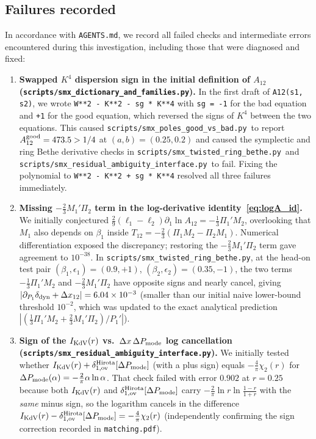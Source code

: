 \documentclass[11pt,a4paper]{article}
\newcommand{\smxdict}{\texttt{scripts/\allowbreak smx\_\allowbreak dictionary\_\allowbreak and\_\allowbreak families.py}}
\newcommand{\smxpoles}{\texttt{scripts/\allowbreak smx\_\allowbreak poles\_\allowbreak good\_\allowbreak vs\_\allowbreak bad.py}}
\newcommand{\smxring}{\texttt{scripts/\allowbreak smx\_\allowbreak twisted\_\allowbreak ring\_\allowbreak bethe.py}}
\newcommand{\smxamb}{\texttt{scripts/\allowbreak smx\_\allowbreak residual\_\allowbreak ambiguity\_\allowbreak interface.py}}
\theoremstyle{remark}
\begin{document}
\subsection{Failures recorded}
In accordance with \texttt{AGENTS.md}, we record all failed checks and intermediate errors encountered during this investigation, including those that were diagnosed and fixed:
\begin{enumerate}
\item \textbf{Swapped $K^4$ dispersion sign in the initial definition of $A_{12}$ (\smxdict).}
In the first draft of \texttt{A12(s1, s2)}, we wrote \texttt{W**2 - K**2 - sg * K**4} with \texttt{sg = -1} for the bad equation and \texttt{+1} for the good equation, which reversed the signs of $K^4$ between the two equations. This caused \smxpoles\ to report $A_{12}^{\rm good}=473.5>1/4$ at $(a,b)=(0.25,0.2)$ and caused the symplectic and ring Bethe derivative checks in \smxring\ and \smxamb\ to fail. Fixing the polynomial to \texttt{W**2 - K**2 + sg * K**4} resolved all three failures immediately.
\item \textbf{Missing $-\frac23 M_1'\Pi_2$ term in the log-derivative identity~\eqref{eq:logA_id}.}
We initially conjectured $\frac29(\ell_1-\ell_2)\partial_1\ln A_{12}=-\frac13\Pi_1' M_2$, overlooking that $M_1$ also depends on $\beta_1$ inside $T_{12}=-\frac23(\Pi_1 M_2-\Pi_2 M_1)$. Numerical differentiation exposed the discrepancy; restoring the $-\frac23 M_1'\Pi_2$ term gave agreement to $10^{-38}$. In \smxring, at the head-on test pair $(\beta_1,\epsilon_1)=(0.9,+1)$, $(\beta_2,\epsilon_2)=(0.35,-1)$, the two terms $-\frac13\Pi_1' M_2$ and $-\frac23 M_1'\Pi_2$ have opposite signs and nearly cancel, giving $|\partial_{P_1}\delta_{\rm dyn}+\Delta x_{12}|=6.04\times 10^{-3}$ (smaller than our initial naive lower-bound threshold $10^{-2}$, which was updated to the exact analytical prediction $|(\frac13\Pi_1' M_2+\frac23 M_1'\Pi_2)/P_1'|$).
\item \textbf{Sign of the $I_{\rm KdV}(r)$ vs.\ $\Delta x\,\Delta P_{\rm mode}$ log cancellation (\smxamb).}
We initially tested whether $I_{\rm KdV}(r)+\delta_{1,\rm ov}^{\rm Hirota}[\Delta P_{\rm mode}]$ (with a plus sign) equals $-\frac4\pi\chi_2(r)$ for $\Delta P_{\rm mode}(\alpha)=-\frac2\pi\alpha\ln\alpha$. That check failed with error $0.902$ at $r=0.25$ because both $I_{\rm KdV}(r)$ and $\delta_{1,\rm ov}^{\rm Hirota}[\Delta P_{\rm mode}]$ carry $-\frac2\pi\ln r\ln\frac{1-r}{1+r}$ with the \emph{same} minus sign, so the logarithm cancels in the difference $I_{\rm KdV}(r)-\delta_{1,\rm ov}^{\rm Hirota}[\Delta P_{\rm mode}]=-\frac4\pi\chi_2(r)$ (independently confirming the sign correction recorded in \texttt{matching.pdf}).

\end{enumerate}
\end{document}
